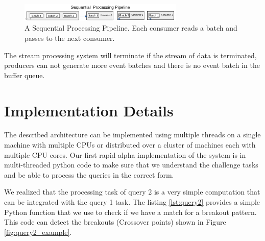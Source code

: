 \begin{figure}[]
    \begin{center}
        \includegraphics[width=0.7\textwidth]{./images/Stream-Batch-Distributions_op2}
        \caption{A Sequential Processing Pipeline. Each consumer reads a batch and passes to the next consumer. }
        \label{fig:Sequential-batch-distributions}
    \end{center}
\end{figure}

The stream processing system will terminate if the stream of data is terminated, producers can not generate more event batches 
and there is no event batch in the buffer queue. 





\section{Implementation Details}\label{sec:implementation}
The described architecture can be implemented using multiple threads on a single machine with multiple CPUs or distributed over a cluster of machines each with multiple CPU cores. Our first rapid alpha implementation of the system is in multi-threaded python code to make sure that we understand the challenge tasks and be able to process the queries in the correct form.  


We realized that the processing task of query 2 is a very simple computation that can be integrated with the query 1 task. 
The listing \ref{lst:query2} provides a simple Python function that we use to check if we have a match for a breakout pattern. 
This code can detect the breakouts (Crossover points) shown in Figure \ref{fig:query2_example}.




